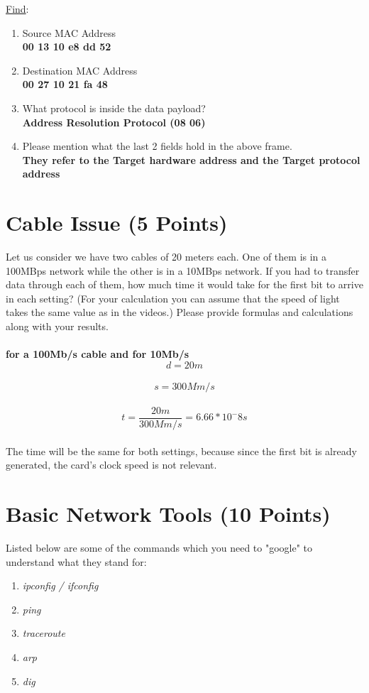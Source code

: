 \documentclass{WeSTassignment}
\begin{document}
\underline{Find}:
\begin{enumerate}
\item Source MAC Address \\
\textbf{00 13 10 e8 dd 52}
\item Destination MAC Address \\
\textbf{00 27 10 21 fa 48}
\item What protocol is inside the data payload? \\
\textbf{Address Resolution Protocol (08 06)}
\item Please mention what the last 2 fields hold in the above frame. \\
\textbf{They refer to the Target hardware address and the Target protocol address }
\end{enumerate}



\section{Cable Issue (5 Points)}

Let us consider we have two cables of 20 meters each. One of them is in a 100MBps network while the other is in a 10MBps network. If you had to transfer data through each of them, how much time it would take for the first bit to arrive in each setting? (For your calculation you can assume that the speed of light takes the same value as in the videos.) Please provide formulas and calculations along with your results. \\
\\ \textbf{for a 100Mb/s cable and for 10Mb/s}
\[d = 20 m\] \\
\[s  = 300M m/s\] \\
\[t  = \frac{20m}{300M m/s} = 6.66*10^-8 s\] \\

The time will be the same for both settings, because since the first bit is already generated, the card's clock speed is not relevant.



\section{Basic Network Tools (10 Points)}

Listed below are some of the commands which you need to "google" to understand what they stand for:
\begin{enumerate}
\item \emph{ipconfig / ifconfig}
\item \emph{ping}
\item \emph{traceroute}
\item \emph{arp}
\item \emph{dig}
\end{enumerate}
\end{document}
